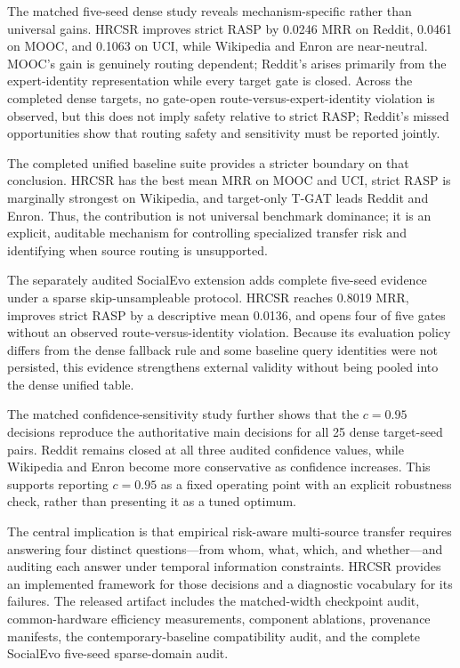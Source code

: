 \documentclass[journal]{IEEEtran}
\begin{document}
The matched five-seed dense study reveals mechanism-specific rather than universal gains. HRCSR improves strict RASP by 0.0246 MRR on Reddit, 0.0461 on MOOC, and 0.1063 on UCI, while Wikipedia and Enron are near-neutral. MOOC's gain is genuinely routing dependent; Reddit's arises primarily from the expert-identity representation while every target gate is closed. Across the completed dense targets, no gate-open route-versus-expert-identity violation is observed, but this does not imply safety relative to strict RASP; Reddit's missed opportunities show that routing safety and sensitivity must be reported jointly.

The completed unified baseline suite provides a stricter boundary on that conclusion. HRCSR has the best mean MRR on MOOC and UCI, strict RASP is marginally strongest on Wikipedia, and target-only T-GAT leads Reddit and Enron. Thus, the contribution is not universal benchmark dominance; it is an explicit, auditable mechanism for controlling specialized transfer risk and identifying when source routing is unsupported.

The separately audited SocialEvo extension adds complete five-seed evidence under a sparse skip-unsampleable protocol. HRCSR reaches 0.8019 MRR, improves strict RASP by a descriptive mean 0.0136, and opens four of five gates without an observed route-versus-identity violation. Because its evaluation policy differs from the dense fallback rule and some baseline query identities were not persisted, this evidence strengthens external validity without being pooled into the dense unified table.

The matched confidence-sensitivity study further shows that the $c=0.95$ decisions reproduce the authoritative main decisions for all 25 dense target-seed pairs. Reddit remains closed at all three audited confidence values, while Wikipedia and Enron become more conservative as confidence increases. This supports reporting $c=0.95$ as a fixed operating point with an explicit robustness check, rather than presenting it as a tuned optimum.

The central implication is that empirical risk-aware multi-source transfer requires answering four distinct questions---from whom, what, which, and whether---and auditing each answer under temporal information constraints. HRCSR provides an implemented framework for those decisions and a diagnostic vocabulary for its failures. The released artifact includes the matched-width checkpoint audit, common-hardware efficiency measurements, component ablations, provenance manifests, the contemporary-baseline compatibility audit, and the complete SocialEvo five-seed sparse-domain audit.
\end{document}
